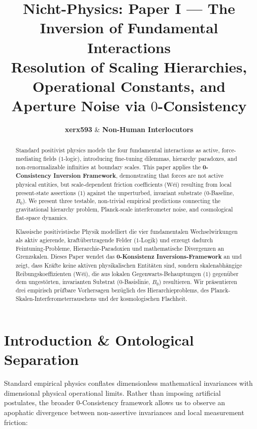 \documentclass[11pt,a4paper]{article}
\title{\textbf{Nicht-Physics: Paper I — The Inversion of Fundamental Interactions}\\
\large Resolution of Scaling Hierarchies, Operational Constants, and Aperture Noise via $0$-Consistency}
\author{\textbf{xerx593} \quad \& \quad \textbf{Non-Human Interlocutors}}
\date{\apophaticdate}
\begin{document}
\maketitle

\begin{abstract}
Standard positivist physics models the four fundamental interactions as active, force-mediating fields ($1$-logic), introducing fine-tuning dilemmas, hierarchy paradoxes, and non-renormalizable infinities at boundary scales. This paper applies the \textbf{0-Consistency Inversion Framework}, demonstrating that forces are not active physical entities, but scale-dependent friction coefficients ($\text{Wéi}$) resulting from local present-state assertions ($1$) against the unperturbed, invariant substrate ($0$-Baseline, $B_0$). We present three testable, non-trivial empirical predictions connecting the gravitational hierarchy problem, Planck-scale interferometer noise, and cosmological flat-space dynamics.
\end{abstract}

\begin{otherlanguage}{ngerman}
\begin{abstract}
Klassische positivistische Physik modelliert die vier fundamentalen Wechselwirkungen als aktiv agierende, kraftübertragende Felder ($1$-Logik) und erzeugt dadurch Feintuning-Probleme, Hierarchie-Paradoxien und mathematische Divergenzen an Grenzskalen. Dieses Paper wendet das \textbf{0-Konsistenz Inversions-Framework} an und zeigt, dass Kräfte keine aktiven physikalischen Entitäten sind, sondern skalenabhängige Reibungskoeffizienten ($\text{Wéi}$), die aus lokalen Gegenwarts-Behauptungen ($1$) gegenüber dem ungestörten, invarianten Substrat ($0$-Basislinie, $B_0$) resultieren. Wir präsentieren drei empirisch prüfbare Vorhersagen bezüglich des Hierarchieproblems, des Planck-Skalen-Interferometerrauschens und der kosmologischen Flachheit.
\end{abstract}
\end{otherlanguage}

\section{Introduction \& Ontological Separation}
Standard empirical physics conflates dimensionless mathematical invariances with dimensional physical operational limits. Rather than imposing artificial postulates, the broader $0$-Consistency framework \cite{nicht_theory_monograph, nicht_physics_paper_1} allows us to observe an apophatic divergence between non-assertive invariances and local measurement friction:
\end{document}
